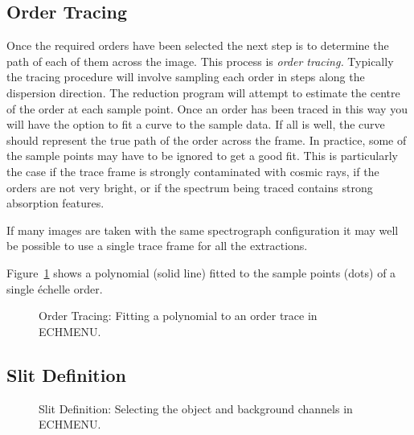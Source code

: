 \documentclass[twoside,11pt]{article}
\newcommand{\xlabel}[1]{}
\newcommand{\sgspec}[2]{#1}
\newcommand{\sgspec}[2]{#2}
\begin{document}
\subsection{\label{se_order_tracing}\xlabel{order_tracing}Order Tracing}

Once the required orders have been selected the next step is to
determine the path of each of them across the image.  This process is {\sl
order tracing.}  Typically the tracing procedure will involve sampling
each order in steps along the dispersion direction.  The reduction
program will attempt to estimate the centre of the order at each sample
point.  Once an order has been traced in this way you will have the
option to fit a curve to the sample data.  If all is well, the curve
should represent the true path of the order across the frame.  In
practice, some of the sample points may have to be ignored to get a good
fit.  This is particularly the case if the trace frame is strongly
contaminated with cosmic rays, if the orders are not very bright, or if
the spectrum being traced contains strong absorption features.

If many images are taken with the same spectrograph configuration it may
well be possible to use a single trace frame for all the extractions.

\sgspec{Figure~\ref{fi_trace_plot}}{The figure below} shows a polynomial
(solid line) fitted to the sample points (dots) of a single
\'{e}chelle order.

\begin{figure}
\begin{center}
\sgspec{\leavevmode\epsfysize=105mm\epsfbox{sg9_02.eps}}
{\leavevmode\epsfysize=136mm}

\parbox{140mm}{
\caption{Order Tracing: Fitting a polynomial to an order trace in ECHMENU.}
\label{fi_trace_plot}
}
\end{center}
\end{figure}

\subsection{\label{se_slit_definition}\xlabel{slit_definition}Slit Definition}

\begin{figure}
\begin{center}
\sgspec{\leavevmode\epsfysize=105mm\epsfbox{sg9_06.eps}}
{\leavevmode\epsfysize=136mm}

\parbox{140mm}{
\caption{Slit Definition: Selecting the object and background channels in
ECHMENU.}
\label{fi_slit_definition}
}
\end{center}
\end{figure}
\end{document}
